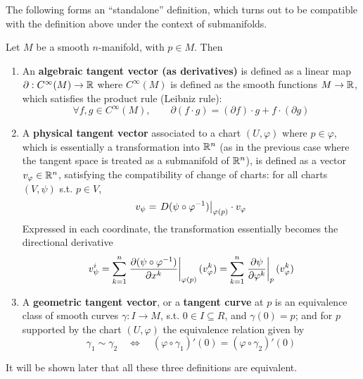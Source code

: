 \documentclass{article}
\begin{document}
The following forms an ``standalone'' definition, which turns out to be compatible with the definition above under the context of submanifolds.

\begin{definition}
    Let $M$ be a smooth $n$-manifold, with $p \in M$. Then
    \begin{enumerate}[label=\roman*)]
        \item An \textbf{algebraic tangent vector (as derivatives)} is defined as a linear map $\partial: C^{\infty}(M) \to \mathbb{R}$ where $C^{\infty}(M)$ is defined as the smooth functions $M \to \mathbb{R}$, which satisfies the product rule (Leibniz rule):
        \[
            \forall f, g \in C^{\infty}(M), \qquad \partial(f \cdot g) = (\partial f) \cdot g + f \cdot (\partial g)
        \]
        \item A \textbf{physical tangent vector} associated to a chart $(U, \varphi)$ where $p \in \varphi$, which is essentially a transformation into $\mathbb{R}^n$ (as in the previous case where the tangent space is treated as a submanifold of $\mathbb{R}^n$), is defined as a vector $v_{\varphi} \in \mathbb{R}^n$, satisfying the compatibility of change of charts: for all charts $(V, \psi)$ s.t. $p \in V$,
        \[
            v_{\psi} = \left.D(\psi \circ \varphi^{-1})\right|_{\varphi(p)} \cdot v_{\varphi}
        \]
        Expressed in each coordinate, the transformation essentially becomes the directional derivative
        \[
            v_{\psi}^i = \sum_{k = 1}^n \left.\frac{\partial (\psi \circ \varphi^{-1})}{\partial x^k}\right|_{\varphi(p)} (v_{\varphi}^k) = \sum_{k=1}^n \left.\frac{\partial \psi}{\partial \varphi^k}\right|_{p} (v_{\varphi}^k)
        \]
        \item A \textbf{geometric tangent vector}, or a \textbf{tangent curve} at $p$ is an equivalence class of smooth curves $\gamma: I \to M$, s.t. $0 \in I \subseteq R$, and $\gamma(0) = p$; and for $p$ supported by the chart $(U, \varphi)$ the equivalence relation given by
        \[
            \gamma_1 \sim \gamma_2 \quad \iff \quad (\varphi \circ \gamma_1)'(0) = (\varphi \circ \gamma_2)'(0)
        \]
    \end{enumerate}
    It will be shown later that all these three definitions are equivalent.
\end{definition}
\end{document}
